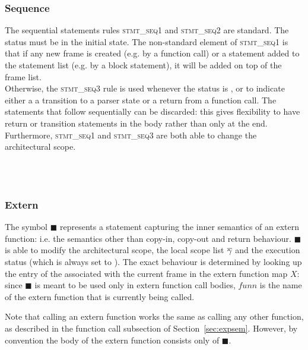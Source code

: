 \documentclass[UTF8]{article}
\begin{document}
\begin{figure}[ht!]
    \ottusedrule{\ottdrulestmtXXretXXv{}} 
\end{figure}

\subsubsection*{Sequence}
The sequential statements rules \textsc{stmt\_seq1} and \textsc{stmt\_seq2} are standard. The status \status{} must be \running{} in the initial state. The non-standard element of \textsc{stmt\_seq1} is that if any new frame is created (e.g. by a function call) or a statement added to the statement list (e.g. by a block statement), it will be added on top of the frame list. \\

Otherwise, the \textsc{stmt\_seq3}  rule is used whenever the status is \returnst{}, or \trans{} to indicate either a a transition to a parser state or a return from a function call. The statements that follow sequentially can be discarded: this gives flexibility to have return or transition statements in the body rather than only at the end.
Furthermore, \textsc{stmt\_seq1} and \textsc{stmt\_seq3} are both able to change the architectural scope.

\begin{figure}[h!]
    \ottusedrule{\ottdrulestmtXXseqOne{}} \\
    \ottusedrule{\ottdrulestmtXXseqTwo{}} \\
    \ottusedrule{\ottdrulestmtXXseqThree{}}
\end{figure}


\subsubsection*{Extern}
The symbol $\blacksquare$ represents a statement capturing the inner semantics of an extern function: i.e. the semantics other than copy-in, copy-out and return behaviour. $\blacksquare$ is able to modify the architectural scope, the local scope list $\overline{\gamma}$ and the execution status (which is always set to ). The exact behaviour is determined by looking up the entry of the \funn{} associated with the current frame in the extern function map $X$: since $\blacksquare$ is meant to be used only in extern function call bodies, $\mathit{funn}$ is the name of the extern function that is currently being called.

Note that calling an extern function works the same as calling any other function, as described in the function call subsection of Section~\ref{sec:expsem}. However, by convention the body of the extern function consists only of $\blacksquare$.
\end{document}
